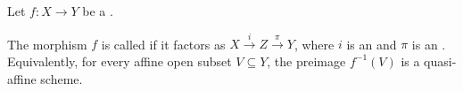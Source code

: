 \begin{definition} \label{definition:quasi_affine_morphism_of_schemes}
    Let $f: X \to Y$ be a .

    The morphism $f$ is called  if it factors as $X \xrightarrow{i} Z \xrightarrow{\pi} Y$, where $i$ is an  and $\pi$ is an . Equivalently, for every affine open subset $V \subseteq Y$, the preimage $f^{-1}(V)$ is a quasi-affine scheme.
\end{definition}
